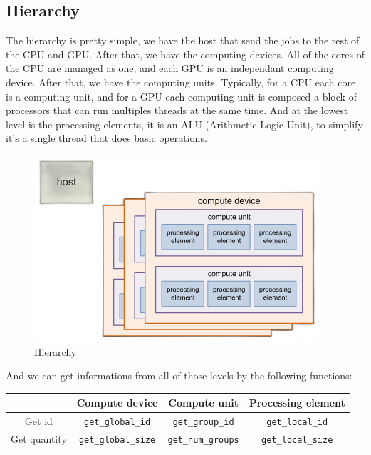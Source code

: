 \documentclass[12pt, openany]{report}
\theoremstyle{definition}
\begin{document}
\subsection{Hierarchy}
The hierarchy is pretty simple, we have the host that send the jobs to the rest of the CPU and GPU. After that, we have the computing devices. All of the cores of the CPU are managed as one, and each GPU is an independant computing device. After that, we have the computing units. Typically, for a CPU each core is a computing unit, and for a GPU each computing unit is composed a block of processors that can run multiples threads at the same time. And at the lowest level is the processing elements, it is an ALU (Arithmetic Logic Unit), to simplify it's a single thread that does basic operations.\\
\begin{figure}[H]
	\centering
	\includegraphics[width=0.8\linewidth]{img/hierarchy.png}
	\caption{Hierarchy}
	\label{fig:Hierarchy}
\end{figure}
And we can get informations from all of those levels by the following functions:
\begin{center}
	\begin{tabular}{|c|c|c|c|}
		\hline
		& \textbf{Compute device} & \textbf{Compute unit} & \textbf{Processing element} \\
		\hline
		Get id & \texttt{get\_global\_id} & \texttt{get\_group\_id} & \texttt{get\_local\_id} \\
		\hline
		Get quantity & \texttt{get\_global\_size} & \texttt{get\_num\_groups} & \texttt{get\_local\_size} \\
		\hline
	\end{tabular}
\end{center}
\newpage
\end{document}
